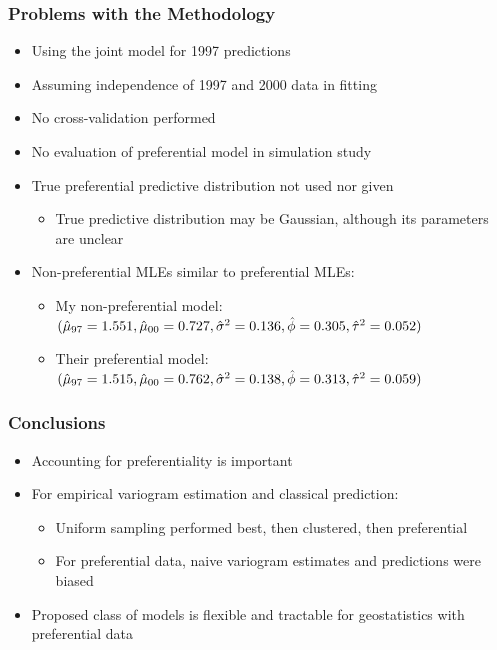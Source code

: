 \documentclass[xcolor=svgnames]{beamer}
\begin{document}
\begin{frame}
\frametitle{Problems with the Methodology}
\begin{itemize}
\setlength\itemsep{.15in}
\item Using the joint model for 1997 predictions
\item Assuming independence of 1997 and 2000 data in fitting
\item No cross-validation performed
\item No evaluation of preferential model in simulation study
\item True preferential predictive distribution not used nor given
\begin{itemize}
\item True predictive distribution may be Gaussian, although its parameters are unclear
\end{itemize}
\item Non-preferential MLEs similar to preferential MLEs:
\begin{itemize}
\item My non-preferential model: \\
$(\hat{\mu}_{97} = 1.551, \hat{\mu}_{00} = 0.727, \hat{\sigma}^2=0.136, \hat{\phi}=0.305, \hat{\tau}^2=0.052)$
\item Their preferential model: \\
$(\hat{\mu}_{97} = 1.515, \hat{\mu}_{00} = 0.762, \hat{\sigma}^2=0.138, \hat{\phi}=0.313, \hat{\tau}^2=0.059)$
\end{itemize}
\end{itemize}
\end{frame}
\begin{frame}
\frametitle{Conclusions}
\begin{itemize}
\setlength\itemsep{.15in}
\item Accounting for preferentiality is important
\item For empirical variogram estimation and classical prediction:
\begin{itemize}
\item Uniform sampling performed best, then clustered, then preferential
\item For preferential data, naive variogram estimates and predictions were biased
\end{itemize}
\item Proposed class of models is flexible and tractable for geostatistics with preferential data
\end{itemize}
\end{frame}
\end{document}
